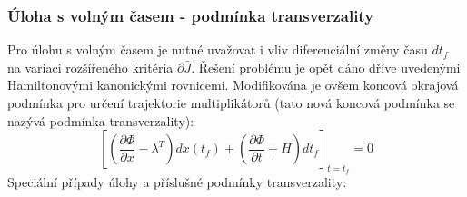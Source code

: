 \subsubsection*{Úloha s volným časem - podmínka transverzality}
Pro úlohu s volným časem je nutné uvažovat i vliv diferenciální změny času $ dt_f $ na variaci rozšířeného kritéria $ \partial \bar{J} $.
\vspace{2.5cm}
Řešení problému je opět dáno dříve uvedenými Hamiltonovými kanonickými rovnicemi. Modifikována je ovšem koncová okrajová podmínka pro určení trajektorie multiplikátorů (tato nová koncová podmínka se nazývá podmínka transverzality):
\begin{equation}
\left[\left(\frac{\partial \Phi}{\partial x} - \lambda^T \right) dx(t_f) + \left(\frac{\partial \Phi}{\partial t} + H \right) dt_f \right]_{t=t_f} = 0
\end{equation}
Speciální případy úlohy a příslušné podmínky transverzality:
